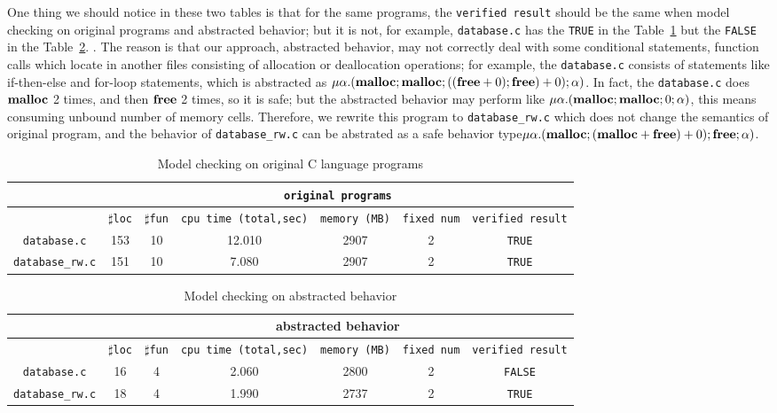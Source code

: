 One thing we should notice in these two tables is that for the
same programs, the \texttt{verified result} should be the same when
model checking on original programs and abstracted behavior; but it is
not, for example, \texttt{database.c} has the \texttt{TRUE} in the
Table~\ref{tb:mcc} but the \texttt{FALSE} in the Table~\ref{tb:mca}.
. The reason is that our approach, abstracted behavior, may not
correctly deal with some conditional statements, function calls which
locate in another files consisting of allocation or deallocation
operations; for example, the \texttt{database.c} consists of
statements like if-then-else and for-loop statements, which is
abstracted as $\mu\alpha.(\mathbf{malloc};\mathbf{malloc};((\mathbf{free} + 0);\mathbf{free}) +
0);\alpha)$. In fact, the \texttt{database.c} does $\mathbf{malloc}$ 2 times,
and then $\mathbf{free}$ 2 times, so it is safe; but the abstracted behavior
may perform like $\mu\alpha.(\mathbf{malloc};\mathbf{malloc};0;\alpha)$, this means
consuming unbound number of memory cells. Therefore, we rewrite this
program to \texttt{database\_rw.c} which does not change the semantics
of original program, and the behavior of \texttt{database\_rw.c} can
be abstrated as a safe behavior type$\mu\alpha.(\mathbf{malloc};(\mathbf{malloc} + \mathbf{free}) +
0);\mathbf{free};\alpha)$.

\begin{table}
  \scriptsize
\begin{tabular}{|c|c|c|c|c|c|c|}
\hline
& \multicolumn{6}{|c|}{\texttt{original programs}}  \\
\hline
 & $\sharp$\texttt{loc} & $\sharp$\texttt{fun} & \texttt{cpu time (total,sec)} & \texttt{memory (MB)} & \texttt{fixed num}& \texttt{verified result} \\
\hline
\texttt{database.c} & 153 & 10 & 12.010 & 2907 & 2  & \texttt{TRUE}  \\
\hline
\texttt{database\_rw.c} & 151 & 10 & 7.080 & 2907 & 2  & \texttt{TRUE}  \\
\hline
\end{tabular}
\caption{Model checking on original C language programs}
\label{tb:mcc}
\end{table}

\begin{table}
  \scriptsize
\begin{tabular}{|c|c|c|c|c|c|c|}
\hline
&\multicolumn{6}{|c|}{abstracted behavior} \\
\hline
 &$\sharp$\texttt{loc} & $\sharp$\texttt{fun} & \texttt{cpu time (total,sec)} & \texttt{memory (MB)} & \texttt{fixed num} & \texttt{verified result} \\
\hline
\texttt{database.c} &  16 & 4 & 2.060 & 2800 & 2 & \texttt{FALSE} \\
\hline
\texttt{database\_rw.c} &  18 & 4 & 1.990 & 2737 & 2 & \texttt{TRUE} \\
\hline
\end{tabular}
\caption{Model checking on abstracted behavior}
\label{tb:mca}
\end{table}


